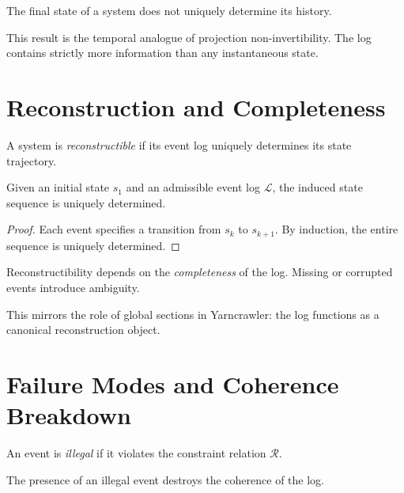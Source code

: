 \documentclass[11pt,openany]{book}
\begin{document}
\begin{corollary}
The final state of a system does not uniquely determine its
history.
\end{corollary}

This result is the temporal analogue of projection
non-invertibility. The log contains strictly more
information than any instantaneous state.

\section{Reconstruction and Completeness}
\label{sec:reconstruction}

\begin{definition}
A system is \emph{reconstructible} if its event log uniquely
determines its state trajectory.
\end{definition}

\begin{proposition}
Given an initial state $s_1$ and an admissible event log
$\mathcal{L}$, the induced state sequence is uniquely
determined.
\end{proposition}

\begin{proof}
Each event specifies a transition from $s_k$ to $s_{k+1}$.
By induction, the entire sequence is uniquely determined.
\end{proof}

\begin{remark}
Reconstructibility depends on the \emph{completeness} of the
log. Missing or corrupted events introduce ambiguity.
\end{remark}

This mirrors the role of global sections in Yarncrawler:
the log functions as a canonical reconstruction object.

\section{Failure Modes and Coherence Breakdown}
\label{sec:failure-spherepop}

\begin{definition}
An event is \emph{illegal} if it violates the constraint
relation $\mathcal{R}$.
\end{definition}

\begin{proposition}
\label{prop:failure-coherence}
The presence of an illegal event destroys the coherence of
the log.
\end{proposition}
\end{document}
